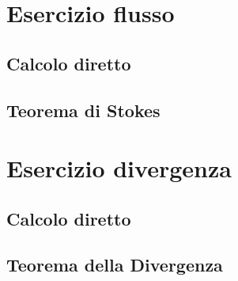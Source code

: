 \documentclass[10pt, oneside]{article}
\begin{document}
\section{Esercizio flusso}

\subsection{Calcolo diretto}

\subsection{Teorema di Stokes}

\section{Esercizio divergenza}

\subsection{Calcolo diretto}

\subsection{Teorema della Divergenza}
\end{document}
